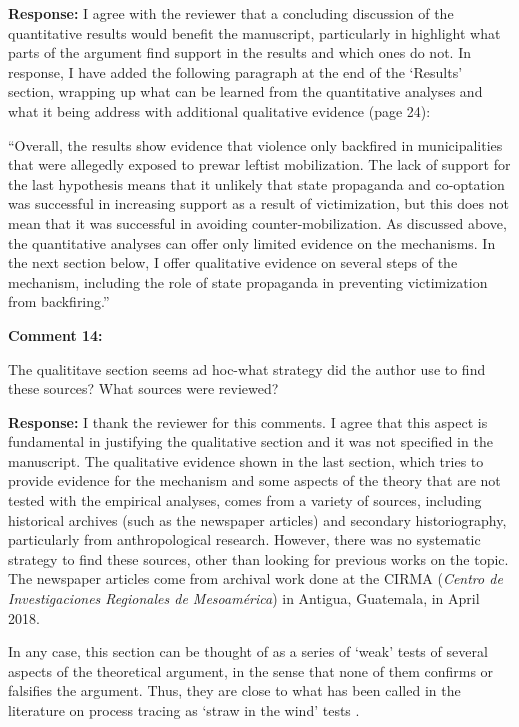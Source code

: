 \documentclass[12pt, a4paper, notitlepage]{article}
\begin{document}
\noindent\textbf{Response:} I agree with the reviewer that a concluding discussion of the quantitative results would benefit the manuscript, particularly in highlight what parts of the argument find support in the results and which ones do not. In response, I have added the following paragraph at the end of the `Results' section, wrapping up what can be learned from the quantitative analyses and what it being address with additional qualitative evidence (page 24):

``Overall, the results show evidence that violence only backfired in municipalities that were allegedly exposed to prewar leftist mobilization.
The lack of support for the last hypothesis means that it unlikely that state propaganda and co-optation was successful in increasing support as a result of victimization, but this does not mean that it was successful in avoiding counter-mobilization.
As discussed above, the quantitative analyses can offer only limited evidence on the mechanisms.
In the next section below, I offer qualitative evidence on several steps of the mechanism, including the role of state propaganda in preventing victimization from backfiring.''

\vspace{15pt}
\noindent\textbf{Comment 14:}
\begin{displayquote}
The qualititave section seems ad hoc-what strategy did the author use to find these sources? What sources were reviewed?
\end{displayquote}


\noindent\textbf{Response:} I thank the reviewer for this comments. I agree that this aspect is fundamental in justifying the qualitative section and it was not specified in the manuscript. The qualitative evidence shown in the last section, which tries to provide evidence for the mechanism and some aspects of the theory that are not tested with the empirical analyses, comes from a variety of sources, including historical archives (such as the newspaper articles) and secondary historiography, particularly from anthropological research. However, there was no systematic strategy to find these sources, other than looking for previous works on the topic. The newspaper articles come from archival work done at the CIRMA (\textit{Centro de Investigaciones Regionales de Mesoamérica}) in Antigua, Guatemala, in April 2018.

In any case, this section can be thought of as a series of `weak' tests of several aspects of the theoretical argument, in the sense that none of them confirms or falsifies the argument. Thus, they are close to what has been called in the literature on process tracing as `straw in the wind' tests \citep{Collier:2011ve}.
\end{document}
